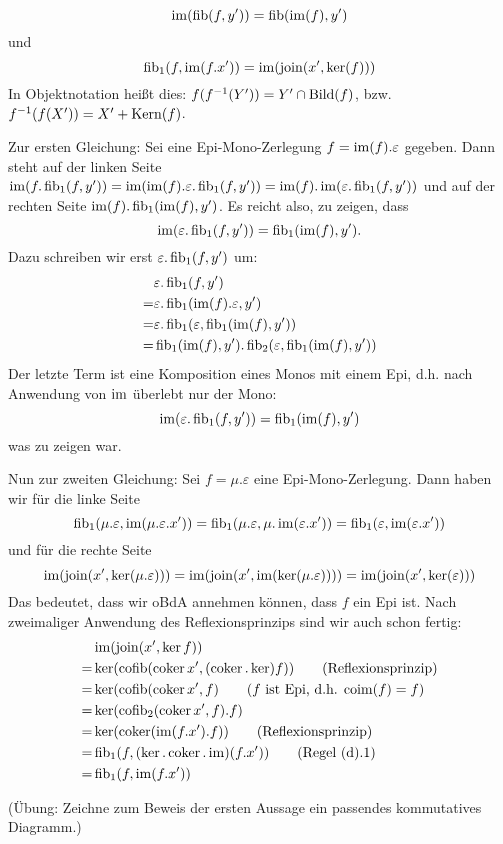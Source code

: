 \begin{lemm}[Regel (e)]
\[
\operatorname{im}(\operatorname{fib}(f,y')) = \operatorname{fib}(\operatorname{im}(f),y')
\]
und
\[
\operatorname{fib}_1(f,\operatorname{im}(f.x')) = \operatorname{im}(\operatorname{join}(x', \ker(f)))
\]
In Objektnotation heißt dies: $f(f^{-1}(Y')) = Y' \cap \operatorname{Bild}(f)$, bzw. $f^{-1}(f(X')) = X' + \operatorname{Kern}(f)$.
\end{lemm}
\begin{bew}
Zur ersten Gleichung:
Sei eine Epi-Mono-Zerlegung $f=\operatorname{im}(f).\varepsilon$ gegeben.
Dann steht auf der linken Seite $\operatorname{im}(f.\operatorname{fib}_1(f,y')) = \operatorname{im}(\operatorname{im}(f).\varepsilon.\operatorname{fib}_1(f,y')) = \operatorname{im}(f).\operatorname{im}(\varepsilon.\operatorname{fib}_1(f,y'))$ und auf der rechten Seite $\operatorname{im}(f).\operatorname{fib}_1(\operatorname{im}(f),y')$. Es reicht also, zu zeigen, dass
\[ \operatorname{im}(\varepsilon.\operatorname{fib}_1(f,y')) = \operatorname{fib}_1(\operatorname{im}(f),y'). \]
Dazu schreiben wir erst $\varepsilon.\operatorname{fib}_1(f,y')$ um:
\begin{align*}
&\varepsilon.\operatorname{fib}_1(f,y')
\\=& \varepsilon.\operatorname{fib}_1(\operatorname{im}(f).\varepsilon,y')
\\=& \varepsilon.\operatorname{fib}_1(\varepsilon,\operatorname{fib}_1(\operatorname{im}(f),y'))
\\=& \operatorname{fib}_1(\operatorname{im}(f),y').\operatorname{fib}_2(\varepsilon,\operatorname{fib}_1(\operatorname{im}(f),y'))
\end{align*}
Der letzte Term ist eine Komposition eines Monos mit einem Epi, d.h. nach Anwendung von $\operatorname{im}$ überlebt nur der Mono:
\[ \operatorname{im}(\varepsilon.\operatorname{fib}_1(f,y')) = \operatorname{fib}_1(\operatorname{im}(f),y') \]
was zu zeigen war.

Nun zur zweiten Gleichung:
Sei $f = \mu.\varepsilon$ eine Epi-Mono-Zerlegung. Dann haben wir für die linke Seite
\[ \operatorname{fib}_1(\mu.\varepsilon,\operatorname{im}(\mu.\varepsilon.x')) = \operatorname{fib}_1(\mu.\varepsilon, \mu.\operatorname{im}(\varepsilon.x')) = \operatorname{fib}_1(\varepsilon, \operatorname{im}(\varepsilon.x')) \]
und für die rechte Seite
\[ \operatorname{im}(\operatorname{join}(x',\ker(\mu.\varepsilon))) = \operatorname{im}(\operatorname{join}(x',\operatorname{im}(\ker(\mu.\varepsilon))))
= \operatorname{im}(\operatorname{join}(x',\ker(\varepsilon))) \]
Das bedeutet, dass wir oBdA annehmen können, dass $f$ ein Epi ist.
Nach zweimaliger Anwendung des Reflexionsprinzips sind wir auch schon fertig:
\begin{align*}
   & \operatorname{im}(\operatorname{join}(x',\ker f))
\\=& \ker(\operatorname{cofib}(\operatorname{coker} x', (\operatorname{coker} . \ker) f)) \qquad\text{(Reflexionsprinzip)}
\\=& \ker(\operatorname{cofib}(\operatorname{coker} x', f) \qquad \text{($f$ ist Epi, d.h. $\operatorname{coim}(f) = f$)}
\\=& \ker(\operatorname{cofib}_2(\operatorname{coker} x', f).f)
\\=& \ker(\operatorname{coker}(\operatorname{im}(f.x').f)) \qquad \text{(Reflexionsprinzip)}
\\=& \operatorname{fib}_1(f,(\ker.\operatorname{coker}.\operatorname{im})(f.x')) \qquad \text{(Regel (d).1)}
\\=& \operatorname{fib}_1(f,\operatorname{im}(f.x'))
\end{align*}

 
(Übung: Zeichne zum Beweis der ersten Aussage ein passendes kommutatives Diagramm.)
\end{bew}

